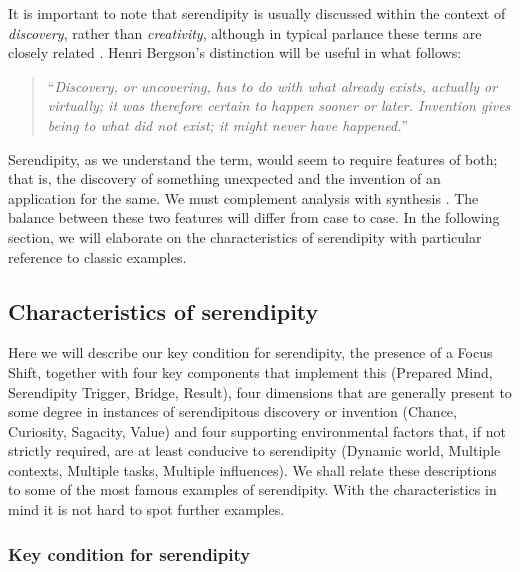 It is important to note that serendipity is usually discussed within
the context of \emph{discovery}, rather than \emph{creativity},
although in typical parlance these terms are closely related
\cite{jordanous12jims}.  Henri Bergson's distinction will be useful in
what follows:
\begin{quote}
``\emph{Discovery, or uncovering, has to do with what already exists,
    actually or virtually; it was therefore certain to happen sooner
    or later.  Invention gives being to what did not exist; it might
    never have happened.}''~\cite{bergson2010creative}
\end{quote}
Serendipity, as we understand the term, would seem to require features
of both; that is, the discovery of something unexpected and the
invention of an application for the same.  We must complement analysis
with synthesis \cite{delanda1993virtual}.  The balance between these
two features will differ from case to case.  In the following section,
we will elaborate on the characteristics of serendipity with
particular reference to classic examples.

\subsection{Characteristics of serendipity}\label{sec:characteristics}

Here we will describe our key condition for serendipity, the presence
of a Focus Shift, together with four key components that implement
this (Prepared Mind, Serendipity Trigger, Bridge, Result), four
dimensions that are generally present to some degree in instances of
serendipitous discovery or invention (Chance, Curiosity, Sagacity,
Value) and four supporting environmental factors that, if not strictly
required, are at least conducive to serendipity (Dynamic world,
Multiple contexts, Multiple tasks, Multiple influences). We shall relate these descriptions to some of the most famous examples of serendipity.
With the characteristics in mind it is not hard to spot further examples.

% 

\subsubsection*{Key condition for serendipity}

